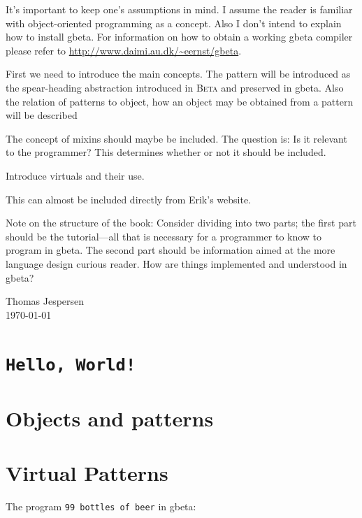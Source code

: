 \documentclass[openany]{memoir}
\newcommand{\gbeta}{\textsf{gbeta}\xspace}
\renewcommand{\beta}{\textsc{Beta}\xspace}
\begin{document}
\begin{description}\setlength{\itemsep}{-2pt}
\item[Assumptions] It's important to keep one's assumptions in mind. I
  assume the reader is familiar with object-oriented programming as a
  concept. Also I don't intend to explain how to install \gbeta . For
  information on how to obtain a working \gbeta compiler please refer
  to \url{http://www.daimi.au.dk/~eernst/gbeta}.
\item[Objects and Patterns] First we need to introduce the main concepts. The
  pattern will be introduced as the spear-heading abstraction
  introduced in \beta and preserved in \gbeta . Also the relation of
  patterns to object, how an object may be obtained from a pattern
  will be described
\item[Mixins] The concept of mixins should maybe be included. The
  question is: Is it relevant to the programmer? This determines
  whether or not it should be included.
\item[Virtual patterns] Introduce virtuals and their use.
\item[The fragment language] This can almost be included directly from
  Erik's website.
\end{description}

Note on the structure of the book: Consider dividing into two parts;
the first part should be the tutorial---all that is necessary for a
programmer to know to program in \gbeta . The second part should be
information aimed at the more language design curious reader. How are
things implemented and understood in \gbeta ?

\begin{flushright}
  Thomas Jespersen\\\today
\end{flushright}

\mainmatter

\chapter{\texttt{Hello, World!}}



\chapter{Objects and patterns}



\chapter{Virtual Patterns}



\newpage

The program \texttt{99 bottles of beer} in \gbeta :





\end{document}
